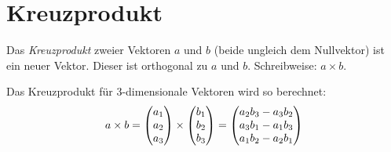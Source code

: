	\section{Kreuzprodukt}
	
		Das \emph{Kreuzprodukt} zweier Vektoren $a$ und $b$ (beide ungleich dem
		Nullvektor) ist ein neuer Vektor. Dieser ist orthogonal zu $a$ und $b$.
		Schreibweise: $a \times b$.
		
		\noindent Das Kreuzprodukt für 3-dimensionale Vektoren wird so berechnet:
		\[a\times b = \mvect{a_1\\a_2\\a_3}\times \mvect{b_1\\b_2\\b_3} =
		\mvect{a_2b_3 - a_3b_2\\ a_3b_1 - a_1b_3\\ a_1b_2 - a_2b_1}\]
		\newline
		
